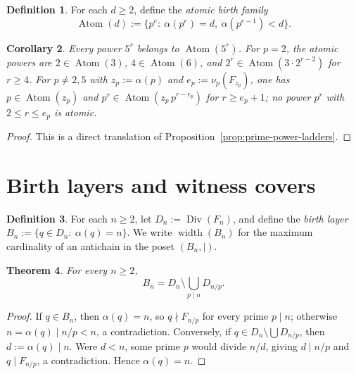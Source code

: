 \documentclass[11pt,letterpaper]{article}
\numberwithin{equation}{section}
\theoremstyle{plain}
\newtheorem{theorem}{Theorem}[section]
\newtheorem{corollary}[theorem]{Corollary}
\theoremstyle{definition}
\newtheorem{definition}[theorem]{Definition}
\theoremstyle{remark}
\DeclareMathOperator{\Atom}{Atom}
\DeclareMathOperator{\widthop}{width}
\begin{document}
\begin{definition}\label{def:atomic-families}
For each $d\ge 2$, define the \emph{atomic birth family}
\[
\Atom(d):=\{p^e:\ \alpha(p^e)=d,\ \alpha(p^{e-1})<d\}.
\]
\end{definition}

\begin{corollary}\label{cor:atomic-classification}
Every power $5^r$ belongs to $\Atom(5^r)$. For $p=2$, the atomic powers are
$2\in\Atom(3)$, $4\in\Atom(6)$, and $2^r\in\Atom(3\cdot 2^{r-2})$ for
$r\ge 4$. For $p\neq 2,5$ with $z_p:=\alpha(p)$ and $e_p:=\nu_p(F_{z_p})$,
one has $p\in\Atom(z_p)$ and $p^r\in\Atom(z_p\,p^{r-e_p})$ for $r\ge e_p+1$;
no power $p^r$ with $2\le r\le e_p$ is atomic.
\end{corollary}

\begin{proof}
This is a direct translation of
Proposition~\ref{prop:prime-power-ladders}.
\end{proof}

\section{Birth layers and witness covers}\label{sec:upper-fibers}

\begin{definition}\label{def:birth-layer}
For each $n\ge 2$, let $D_n:=\operatorname{Div}(F_n)$, and define the
\emph{birth layer} $B_n:=\{q\in D_n:\ \alpha(q)=n\}$. We write
$\widthop(B_n)$ for the maximum cardinality of an antichain in the poset
$(B_n,\mid)$.
\end{definition}

\begin{theorem}\label{thm:upper-fiber}
For every $n\ge 2$,
\[
B_n=D_n\setminus\bigcup_{p\mid n}D_{n/p}.
\]
\end{theorem}

\begin{proof}
If $q\in B_n$, then $\alpha(q)=n$, so $q\nmid F_{n/p}$ for every prime
$p\mid n$; otherwise $n=\alpha(q)\mid n/p<n$, a contradiction. Conversely, if
$q\in D_n\setminus\bigcup D_{n/p}$, then $d:=\alpha(q)\mid n$. Were $d<n$,
some prime $p$ would divide $n/d$, giving $d\mid n/p$ and $q\mid F_{n/p}$, a
contradiction. Hence $\alpha(q)=n$.
\end{proof}
\end{document}
